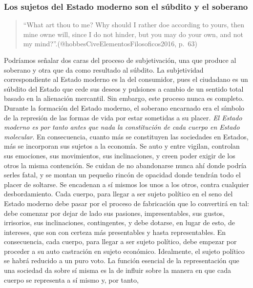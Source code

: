\documentclass[
]{article}
\begin{document}
\hypertarget{los-sujetos-del-estado-moderno-son-el-suxfabdito-y-el-soberano}{%
\subsubsection{Los sujetos del Estado moderno son el súbdito y el
soberano}\label{los-sujetos-del-estado-moderno-son-el-suxfabdito-y-el-soberano}}

\begin{quote}
``What art thou to me? Why should I rather doe according to yours, then
mine owne will, since I do not hinder, but you may do your own, and not
my mind?''.(@hobbesCiveElementosFilosoficos2016, p.~63)
\end{quote}

Podríamos señalar dos caras del proceso de subjetivación, una que
produce al soberano y otra que da como resultado al súbdito. La
subjetividad correspondiente al Estado moderno es la del consumidor,
pues el ciudadano es un súbdito del Estado que cede sus deseos y
pulsiones a cambio de un sentido total basado en la alienación
mercantil. Sin embargo, este proceso nunca es completo. Durante la
formación del Estado moderno, el soberano encarnado era el símbolo de la
represión de las formas de vida por estar sometidas a su placer.
\emph{El Estado moderno es por tanto antes que nada la constitución de
cada cuerpo en Estado molecular}. En consecuencia, cuanto más se
constituyen las sociedades en Estados, más se incorporan sus sujetos a
la economía. Se auto y entre vigilan, controlan sus emociones, sus
movimientos, sus inclinaciones, y creen poder exigir de los otros la
misma contención. Se cuidan de no abandonarse nunca ahí donde podría
serles fatal, y se montan un pequeño rincón de opacidad donde tendrán
todo el placer de soltarse. Se encadenan a sí mismos los unos a los
otros, contra cualquier desbordamiento. Cada cuerpo, para llegar a ser
sujeto político en el seno del Estado moderno debe pasar por el proceso
de fabricación que lo convertirá en tal: debe comenzar por dejar de lado
sus pasiones, impresentables, sus gustos, irrisorios, sus inclinaciones,
contingentes, y debe dotarse, en lugar de esto, de intereses, que son
con certeza más presentables y hasta representables. En consecuencia,
cada cuerpo, para llegar a ser sujeto político, debe empezar por
proceder a su auto castración en sujeto económico. Idealmente, el sujeto
político se habrá reducido a un puro voto. La función esencial de la
representación que una sociedad da sobre sí misma es la de influir sobre
la manera en que cada cuerpo se representa a sí mismo y, por tanto,
\end{document}

